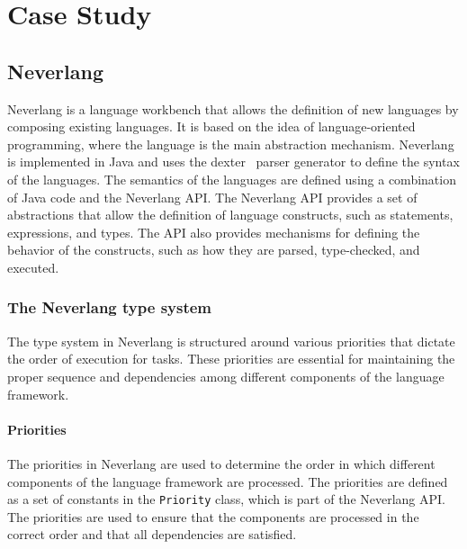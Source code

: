 \chapter{Case Study}\label{ch:case-study}

\section{Neverlang}\label{sec:neverlang}

Neverlang is a language workbench that allows the definition of new languages by composing existing languages. It is based on the idea of language-oriented programming, where the language is the main abstraction mechanism. Neverlang is implemented in Java and uses the dexter~\cite{Cazzola12d} parser generator to define the syntax of the languages. The semantics of the languages are defined using a combination of Java code and the Neverlang API. The Neverlang API provides a set of abstractions that allow the definition of language constructs, such as statements, expressions, and types. The API also provides mechanisms for defining the behavior of the constructs, such as how they are parsed, type-checked, and executed.

\subsection{The Neverlang type system}\label{sec:neverlang-type-system}

The type system in Neverlang is structured around various priorities that dictate the order of execution for tasks. These priorities are essential for maintaining the proper sequence and dependencies among different components of the language framework.

\subsubsection{Priorities}\label{sec:neverlang-priorities}

The priorities in Neverlang are used to determine the order in which different components of the language framework are processed. The priorities are defined as a set of constants in the \texttt{Priority} class, which is part of the Neverlang API. The priorities are used to ensure that the components are processed in the correct order and that all dependencies are satisfied.

